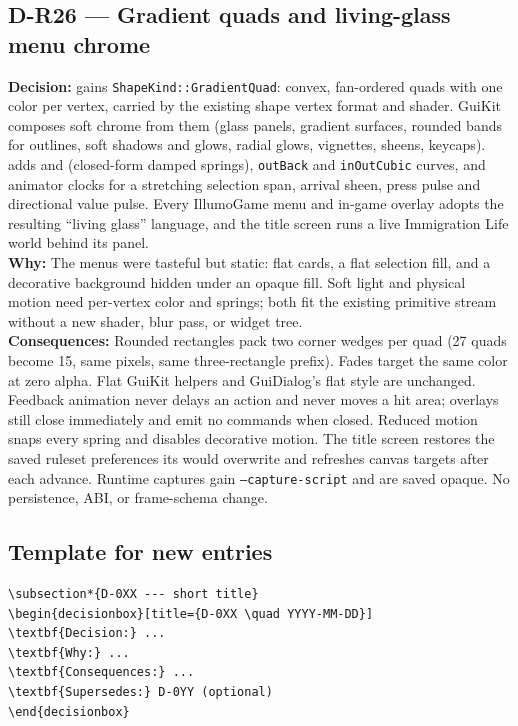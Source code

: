 \subsection*{D-R26 --- Gradient quads and living-glass menu chrome}
\begin{decisionbox}[title={D-R26 \quad 2026-09-22}]
\textbf{Decision:}  gains
\texttt{ShapeKind::GradientQuad}: convex, fan-ordered quads with one color per
vertex, carried by the existing shape vertex format and shader. GuiKit composes
soft chrome from them (glass panels, gradient surfaces, rounded bands for
outlines, soft shadows and glows, radial glows, vignettes, sheens, keycaps).
 adds  and
 (closed-form damped springs), \texttt{outBack} and
\texttt{inOutCubic} curves, and animator clocks for a stretching selection
span, arrival sheen, press pulse and directional value pulse. Every IllumoGame
menu and in-game overlay adopts the resulting ``living glass'' language, and
the title screen runs a live Immigration Life world behind its panel.\\
\textbf{Why:} The menus were tasteful but static: flat cards, a flat selection
fill, and a decorative background hidden under an opaque fill. Soft light and
physical motion need per-vertex color and springs; both fit the existing
primitive stream without a new shader, blur pass, or widget tree.\\
\textbf{Consequences:} Rounded rectangles pack two corner wedges per quad
(27 quads become 15, same pixels, same three-rectangle prefix). Fades target
the same color at zero alpha. Flat GuiKit helpers and GuiDialog's flat style
are unchanged. Feedback animation never delays an action and never moves a hit
area; overlays still close immediately and emit no commands when closed.
Reduced motion snaps every spring and disables decorative motion. The title
screen restores the saved ruleset preferences its 
would overwrite and refreshes canvas targets after each advance. Runtime
captures gain \texttt{--capture-script} and are saved opaque. No persistence,
ABI, or frame-schema change.
\end{decisionbox}

\subsection*{Template for new entries}
\begin{lstlisting}[language={}]
\subsection*{D-0XX --- short title}
\begin{decisionbox}[title={D-0XX \quad YYYY-MM-DD}]
\textbf{Decision:} ...
\textbf{Why:} ...
\textbf{Consequences:} ...
\textbf{Supersedes:} D-0YY (optional)
\end{decisionbox}
\end{lstlisting}

